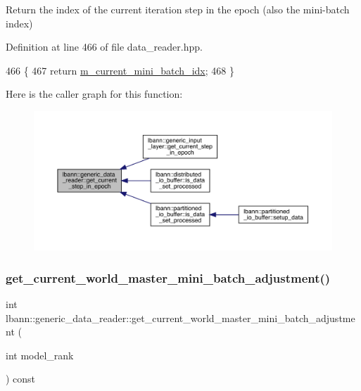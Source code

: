 Return the index of the current iteration step in the epoch (also the mini-\/batch index) 



Definition at line 466 of file data\+\_\+reader.\+hpp.


\begin{DoxyCode}
466                                         \{
467     \textcolor{keywordflow}{return}  \hyperlink{classlbann_1_1generic__data__reader_aefd4bc0bf95de1e2500827581acf3536}{m\_current\_mini\_batch\_idx};
468   \}
\end{DoxyCode}
Here is the caller graph for this function\+:\nopagebreak
\begin{figure}[H]
\begin{center}
\leavevmode
\includegraphics[width=350pt]{classlbann_1_1generic__data__reader_a7c884d3646396a05d9e01e3b7a260419_icgraph}
\end{center}
\end{figure}
\mbox{\label{classlbann_1_1generic__data__reader_af80711baa226f8bc370e8e276c49f3c1}} 
\subsubsection{\texorpdfstring{get\+\_\+current\+\_\+world\+\_\+master\+\_\+mini\+\_\+batch\+\_\+adjustment()}{get\_current\_world\_master\_mini\_batch\_adjustment()}}
{\footnotesize\ttfamily int lbann\+::generic\+\_\+data\+\_\+reader\+::get\+\_\+current\+\_\+world\+\_\+master\+\_\+mini\+\_\+batch\+\_\+adjustment (\begin{DoxyParamCaption}\item[{int}]{model\+\_\+rank }\end{DoxyParamCaption}) const}



